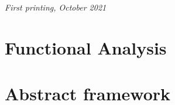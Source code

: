\documentclass[11pt,fleqn]{book} %
\begin{document}
\noindent \textit{First printing, October 2021} %




\usechapterimagefalse %


\pagestyle{empty} %

\tableofcontents %

\cleardoublepage %

\pagestyle{fancy} %

\part{Functional Analysis}




\part{Abstract framework}





\end{document}
